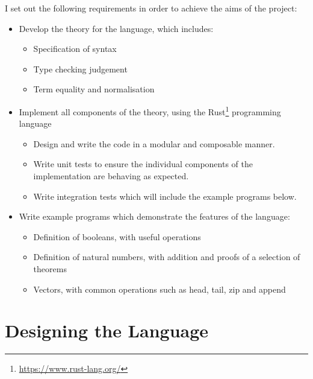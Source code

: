 \documentclass[12pt,a4paper,twoside]{report}
\begin{document}
I set out the following requirements in order to achieve the aims of the project:
\begin{itemize}
    \item Develop the theory for the language, which includes:
          \begin{itemize}
              \item Specification of syntax
              \item Type checking judgement
              \item Term equality and normalisation
          \end{itemize}
    \item Implement all components of the theory, using the Rust\footnote{\url{https://www.rust-lang.org/}} programming language
          \begin{itemize}
              \item Design and write the code in a modular and composable manner.
              \item Write unit tests to ensure the individual components of the implementation are behaving as expected.
              \item Write integration tests which will include the example programs below.
          \end{itemize}
    \item Write example programs which demonstrate the features of the language:
          \begin{itemize}
              \item Definition of booleans, with useful operations
              \item Definition of natural numbers, with addition and proofs of a selection of theorems
              \item Vectors, with common operations such as head, tail, zip and append
          \end{itemize}
\end{itemize}

\section{Designing the Language}
\end{document}
